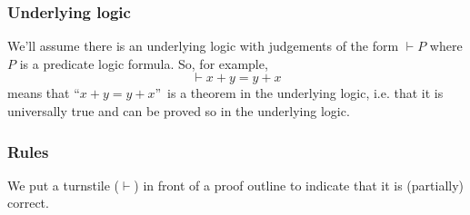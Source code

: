 \documentclass[11pt]{article}%
\begin{document}
\subsubsection{Underlying logic}

We'll assume there is an underlying logic with judgements of the form $\vdash
P$ where $P$ is a predicate logic formula. So, for example,%
\[
\vdash x+y=y+x
\]
means that \textquotedblleft$x+y=y+x$\textquotedblright\ is a theorem in the
underlying logic, i.e. that it is universally true and can be proved so in the
underlying logic.

\subsubsection{Rules}

We put a turnstile ($\vdash$) in front of a proof outline to indicate that it
is (partially) correct.
\end{document}

